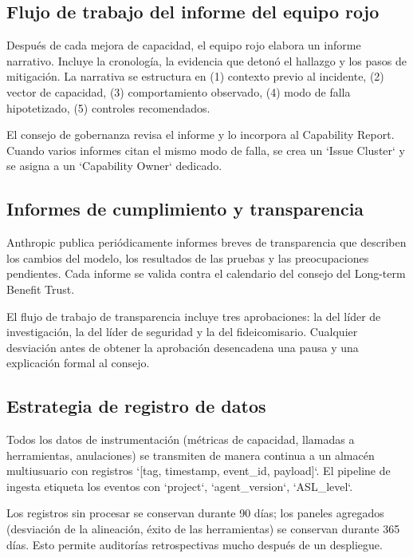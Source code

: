\documentclass[a4paper]{article}
\begin{document}
\subsection{Flujo de trabajo del informe del equipo rojo}

Después de cada mejora de capacidad, el equipo rojo elabora un informe narrativo. Incluye la cronología, la evidencia que detonó el hallazgo y los pasos de mitigación. La narrativa se estructura en (1) contexto previo al incidente, (2) vector de capacidad, (3) comportamiento observado, (4) modo de falla hipotetizado, (5) controles recomendados.

El consejo de gobernanza revisa el informe y lo incorpora al Capability Report. Cuando varios informes citan el mismo modo de falla, se crea un `Issue Cluster` y se asigna a un `Capability Owner` dedicado.

\subsection{Informes de cumplimiento y transparencia}

Anthropic publica periódicamente informes breves de transparencia que describen los cambios del modelo, los resultados de las pruebas y las preocupaciones pendientes. Cada informe se valida contra el calendario del consejo del Long-term Benefit Trust.

El flujo de trabajo de transparencia incluye tres aprobaciones: la del líder de investigación, la del líder de seguridad y la del fideicomisario. Cualquier desviación antes de obtener la aprobación desencadena una pausa y una explicación formal al consejo.

\subsection{Estrategia de registro de datos}

Todos los datos de instrumentación (métricas de capacidad, llamadas a herramientas, anulaciones) se transmiten de manera continua a un almacén multiusuario con registros `[tag, timestamp, event\_id, payload]`. El pipeline de ingesta etiqueta los eventos con `project`, `agent\_version`, `ASL\_level`.

Los registros sin procesar se conservan durante 90 días; los paneles agregados (desviación de la alineación, éxito de las herramientas) se conservan durante 365 días. Esto permite auditorías retrospectivas mucho después de un despliegue.
\end{document}
